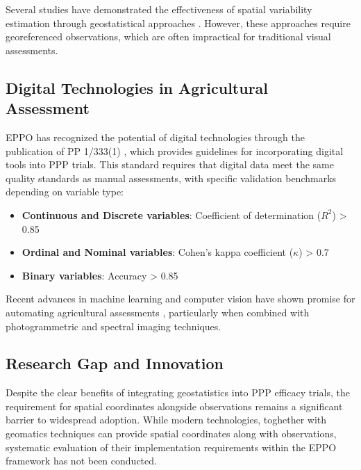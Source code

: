 \documentclass[12pt,a4paper,oneside]{report}
\begin{document}
Several studies have demonstrated the effectiveness of spatial variability estimation through geostatistical approaches \cite{bullockDataIntensiveFarmManagement2019,castrignanoGeostatisticalApproachModelling2017,jinEfficientGeostatisticalAnalysis2021,puntelLeveragingDigitalAgriculture2024,trevisanSpatialVariabilityCrop2021}. However, these approaches require georeferenced observations, which are often impractical for traditional visual assessments.

\subsection{Digital Technologies in Agricultural Assessment}

EPPO has recognized the potential of digital technologies through the publication of PP 1/333(1) \cite{PP1333}, which provides guidelines for incorporating digital tools into PPP trials. This standard requires that digital data meet the same quality standards as manual assessments, with specific validation benchmarks depending on variable type:

\begin{itemize}
    \item \textbf{Continuous and Discrete variables}: Coefficient of determination ($R^2$) > 0.85
    \item \textbf{Ordinal and Nominal variables}: Cohen's kappa coefficient ($\kappa$) > 0.7  
    \item \textbf{Binary variables}: Accuracy > 0.85
\end{itemize}

Recent advances in machine learning and computer vision have shown promise for automating agricultural assessments \cite{mahleinPlantDiseaseDetection2016,kamilarisDeepLearningAgriculture2018}, particularly when combined with photogrammetric and spectral imaging techniques.

\subsection{Research Gap and Innovation}

Despite the clear benefits of integrating geostatistics into PPP efficacy trials, the requirement for spatial coordinates alongside observations remains a significant barrier to widespread adoption. While modern technologies, toghether with geomatics techniques can provide spatial coordinates along with observations, systematic evaluation of their implementation requirements within the EPPO framework has not been conducted.
\end{document}
